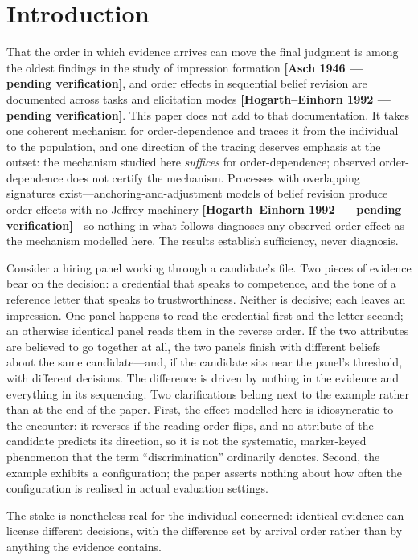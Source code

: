 \documentclass[review,12pt,authoryear]{elsarticle}
\theoremstyle{remark}
\theoremstyle{definition}
\newcommand{\pcite}[1]{\textbf{[#1 --- pending verification]}}
\begin{document}
\section{Introduction}
\label{sec:intro}

That the order in which evidence arrives can move the final judgment is among the oldest
findings in the study of impression formation \pcite{Asch 1946}, and order effects in sequential
belief revision are documented across tasks and elicitation modes \pcite{Hogarth--Einhorn 1992}.
This paper does not add to that documentation. It takes one coherent mechanism for
order-dependence and traces it from the individual to the population, and one direction of the
tracing deserves emphasis at the outset: the mechanism studied here \emph{suffices} for
order-dependence; observed order-dependence does not certify the mechanism. Processes with
overlapping signatures exist---anchoring-and-adjustment models of belief revision produce order
effects with no Jeffrey machinery \pcite{Hogarth--Einhorn 1992}---so nothing in what follows
diagnoses any observed order effect as the mechanism modelled here. The results establish
sufficiency, never diagnosis.

Consider a hiring panel working through a candidate's file. Two pieces of evidence bear on the
decision: a credential that speaks to competence, and the tone of a reference letter that speaks
to trustworthiness. Neither is decisive; each leaves an impression. One panel happens to read
the credential first and the letter second; an otherwise identical panel reads them in the
reverse order. If the two attributes are believed to go together at all, the two panels finish
with different beliefs about the same candidate---and, if the candidate sits near the panel's
threshold, with different decisions. The difference is driven by nothing in the evidence and
everything in its sequencing. Two clarifications belong next to the example rather than at the
end of the paper. First, the effect modelled here is idiosyncratic to the encounter: it reverses
if the reading order flips, and no attribute of the candidate predicts its direction, so it is
not the systematic, marker-keyed phenomenon that the term ``discrimination'' ordinarily denotes.
Second, the example exhibits a configuration; the paper asserts nothing about how often the
configuration is realised in actual evaluation settings.

The stake is nonetheless real for the individual concerned: identical evidence can license
different decisions, with the difference set by arrival order rather than by anything the
evidence contains.
\end{document}
